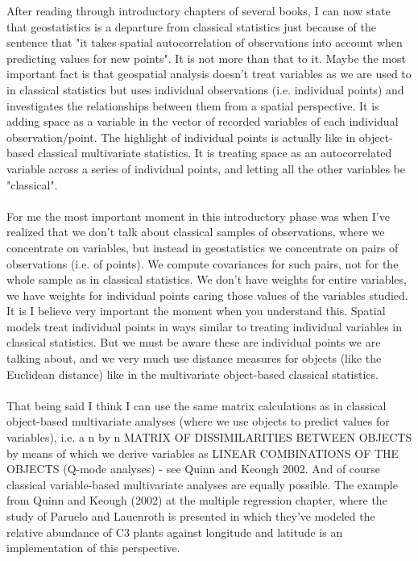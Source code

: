 \documentclass {article}
\begin{document}
After reading through introductory chapters of several books, I can now state that geostatistics is a departure from classical statistics just because of the sentence that "it takes spatial autocorrelation of observations into account when predicting values for new points". It is not more than that to it.
Maybe the most important fact is that geospatial analysis doesn't treat variables as we are used to in classical statistics but uses individual observations (i.e. individual points) and investigates the relationships between them from a spatial perspective.
 It is adding space as a variable in the vector of recorded variables of each individual observation/point. The highlight of individual points is actually like in object-based classical multivariate statistics. It is treating space as an autocorrelated variable across a series of individual points, and letting all the other variables be "classical". 
\\
\\
For me the most important moment in this introductory phase was when I've realized that we don't talk about classical samples of observations, where we concentrate on variables, but instead in geostatistics we concentrate on pairs of observations (i.e. of points). 
We compute covariances for such pairs, not for the whole sample as in classical statistics. We don't have weights for entire variables, we have weights for individual points caring those values of the variables studied. 
It is I believe very important the moment when you understand this. Spatial models treat individual points in ways similar to treating individual variables in classical statistics. But we must be aware these are individual points we are talking about, and we very much use distance measures for objects (like the Euclidean distance) like in the multivariate object-based classical statistics.
\\
\\
That being said I think I can use the same matrix calculations as in classical object-based multivariate analyses (where we use objects to predict values for variables), i.e. a n by n MATRIX OF DISSIMILARITIES BETWEEN OBJECTS by means of which we derive variables as LINEAR COMBINATIONS OF THE OBJECTS (Q-mode analyses) - see Quinn and Keough 2002.  
And of course classical variable-based multivariate analyses are equally possible. 
The example from Quinn and Keough (2002) at the multiple regression chapter, where the study of Paruelo and Lauenroth is presented in which they've modeled the relative abundance of C3 plants against longitude and latitude is an implementation of this perspective.
\end{document}
